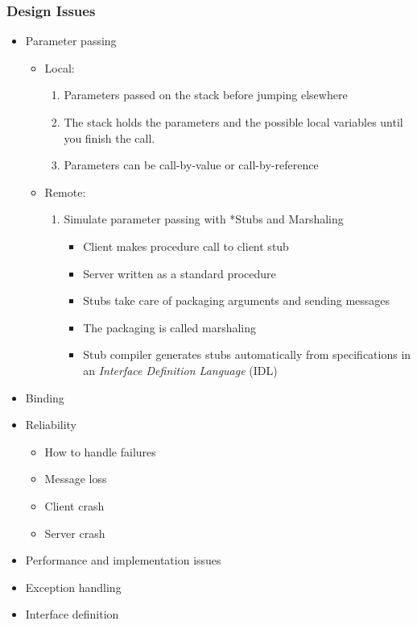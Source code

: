 \subsubsection{Design Issues}\label{subsubsec:RPC_Design_Issues}
\begin{itemize}[noitemsep]
\item Parameter passing
  \begin{itemize}[noitemsep]
  \item Local:
    \begin{enumerate}[noitemsep]
    \item Parameters passed on the stack before jumping elsewhere
    \item The stack holds the parameters and the possible local variables until you finish the call.
    \item Parameters can be call-by-value or call-by-reference
    \end{enumerate}
  \item Remote:
    \begin{enumerate}[noitemsep]
    \item Simulate parameter passing with *Stubs and Marshaling
      \begin{itemize}[noitemsep]
      \item Client makes procedure call to client stub
      \item Server written as a standard procedure
      \item Stubs take care of packaging arguments and sending messages
      \item The packaging is called marshaling
      \item Stub compiler generates stubs automatically from specifications in an \emph{Interface Definition Language} (IDL)
      \end{itemize}
    \end{enumerate}
  \end{itemize}
\item Binding
\item Reliability
  \begin{itemize}[noitemsep]
  \item How to handle failures
  \item Message loss
  \item Client crash
  \item Server crash
  \end{itemize}
\item Performance and implementation issues
\item Exception handling
\item Interface definition
\end{itemize}

